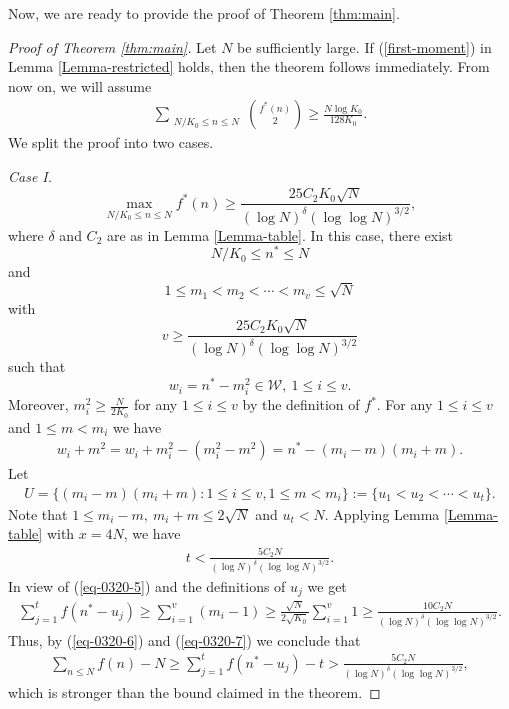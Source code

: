 \documentclass[12pt,a4paper,reqno]{amsart}
\numberwithin{equation}{section}
\theoremstyle{plain}
\theoremstyle{definition}
\begin{document}
Now, we are ready to provide the proof of Theorem \ref{thm:main}.

\begin{proof}[Proof of Theorem \ref{thm:main}]
Let $N$ be sufficiently large. If (\ref{first-moment}) in Lemma \ref{Lemma-restricted} holds, then the theorem follows immediately. From now on, we will assume 
\begin{align}\label{second-moment}
\sum_{\substack{N/K_0\leq n \leq N }}\binom{f^*(n)}{2}\ge \frac{N\log K_0}{128K_0}.
\end{align}
We split the proof into two cases.

{\it Case I.} 
$$
\max_{N/K_0\le n\le N}f^*(n)\ge \frac{25C_2K_0\sqrt{N}}{(\log N)^{\delta}(\log\log N)^{3/2}},
$$
where $\delta$ and $C_2$ are as in Lemma \ref{Lemma-table}.
In this case, there exist 
$$
N/K_0\le n^*\le N
$$ 
and 
$$
1\le m_1<m_2<\cdots<m_v\le \sqrt{N}
$$ 
with 
$$
v\ge \frac{25C_2K_0\sqrt{N}}{(\log N)^{\delta}(\log\log N)^{3/2}}
$$
such that
$$
w_i=n^*-m_i^2\in \mathcal{W},\ 1\le i\le v.
$$
Moreover, $m_i^2\ge \frac{N}{2K_0}$ for any $1\le i\le v$ by the definition of $f^*$.
For any $1\le i\le v$ and $1\le m< m_i$ we have
\begin{align}\label{eq-0320-5}
w_i+m^2=w_i+m_i^2-(m_i^2-m^2)=n^*-(m_i-m)(m_i+m).
\end{align}
Let 
\begin{align*}
U=\{(m_i-m)(m_i+m): 1\le i\le v, 1\le m< m_i\}:=\{u_1<u_2<\cdots<u_t\}.
\end{align*}
Note that
$1\le m_i-m,\ m_i+m \le 2\sqrt{N}$ and 
$
u_t< N.
$
Applying Lemma \ref{Lemma-table} with $x=4N$, we have
\begin{align}\label{eq-0320-6}
t<\frac{5C_2N}{(\log N)^\delta(\log\log N)^{3/2}}.
\end{align}
In view of (\ref{eq-0320-5}) and the definitions of $u_j$ we get
\begin{align}\label{eq-0320-7}
 \sum_{j=1}^{t}f(n^*-u_j)\ge \sum_{i=1}^{v}(m_i-1)\ge \frac{\sqrt{N}}{2\sqrt{K_0}}\sum_{i=1}^{v}1 \ge \frac{10C_2 N}{(\log N)^{\delta}(\log\log N)^{3/2}}.
\end{align}
Thus, by (\ref{eq-0320-6}) and (\ref{eq-0320-7}) we conclude that
\begin{align*}
  \sum_{n\le N}f(n)-N\ge   \sum_{j=1}^{t}f(n^*-u_j)-t>\frac{5C_2N}{(\log N)^\delta(\log\log N)^{3/2}},
\end{align*}
which is stronger than the bound claimed in the theorem.


\end{proof}
\end{document}
